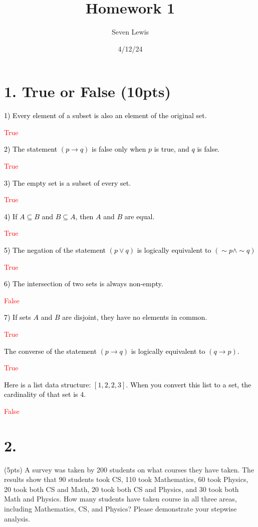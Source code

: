 \documentclass{article}
\title{Homework 1}
\author{Seven Lewis}
\date{4/12/24}
\newcommand{\problem}[1]{\noindent\textcolor{black}{#1}}
\newcommand{\solution}[1]{\noindent\textcolor{red}{#1}}
\newenvironment{Problem}
{\noindent\color{black}}
{\newline}
\begin{document}
\maketitle

\section*{1. True or False (10pts)}
\problem{1)	Every element of a subset is also an element of the original set.}

\solution{True}


\problem{2) The statement $(p \rightarrow q)$ is false only when $p$ is true, and $q$ is false.}

\solution{True}


\problem{3) The empty set is a subset of every set.}

\solution{True}


\problem{4) If $A \subseteq B$ and $B \subseteq A$, then $A$ and $B$ are equal.}

\solution{True}
 

\problem{5) The negation of the statement $(p \lor q)$ is logically equivalent to $(\sim p \land \sim q)$}

\solution{True}


\problem{6) The intersection of two sets is always non-empty.}

\solution{False}


\problem{7) If sets $A$ and $B$ are disjoint, they have no elements in common.}

\solution{True}


\problem{The converse of the statement $(p \rightarrow q)$ is logically equivalent to $(q \rightarrow p)$.}

\solution{True}


\problem{Here is a list data structure: $[1,2,2,3]$. When you convert this list to a set, the cardinality of that set is $4$.}

\solution{False}



\vspace*{27em}


\section*{2. }

\begin{Problem}
    (5pts) A survey was taken by 200 students on what courses they have taken. The
    results show that 90 students took CS, 110 took Mathematics, 60 took
    Physics, 20 took both CS and Math, 20 took both CS and Physics, and 30 took
    both Math and Physics. How many students have taken course in all three
    areas, including Mathematics, CS, and Physics? Please demonstrate your
    stepwise analysis.
\end{Problem}
\end{document}
